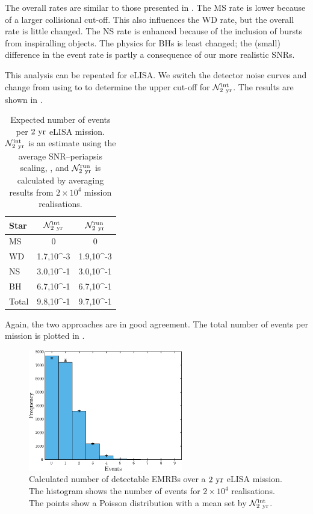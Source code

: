 The overall rates are similar to those presented in \citet{Hopman2007}. The MS rate is lower because of a larger collisional cut-off. This also influences the WD rate, but the overall rate is little changed. The NS rate is enhanced because of the inclusion of bursts from inspiralling objects. The physics for BHs is least changed; the (small) difference in the event rate is partly a consequence of our more realistic SNRs.

This analysis can be repeated for eLISA. We switch the detector noise curves and change from using  to  to determine the upper cut-off for $\mathcal{N}_{2~\mathrm{yr}}^\mathrm{int}$. The results are shown in .
\begin{table}\footnotesize
\centering
  \begin{tabular}{l D{,}{\,\times\,}{3.4} D{,}{\,\times\,}{3.4}}
  \toprule
  Star &  &  \\ \midrule
  MS &  &  \\
  WD & 1.7,10^{-3} & 1.9,10^{-3} \\
  NS & 3.0,10^{-1} & 3.0,10^{-1}  \\
  BH & 6.7,10^{-1} & 6.7,10^{-1} \\
  \midrule
  Total & 9.8,10^{-1} & 9.7,10^{-1} \\
  \bottomrule
\end{tabular}
  \caption{Expected number of events per $2~\mathrm{yr}$ eLISA mission. $\mathcal{N}_{2~\mathrm{yr}}^\mathrm{int}$ is an estimate using the average SNR--periapsis scaling, , and $\mathcal{N}_{2~\mathrm{yr}}^\mathrm{run}$ is calculated by averaging results from $2 \times 10^4$ mission realisations.}\label{tab:eLISA-Rates}
\end{table}
Again, the two approaches are in good agreement. The total number of events per mission is plotted in .
\begin{figure}%
\centering
   \includegraphics[width=0.6\textwidth]{./images/Fig_Total_event_hist_eLISA}
\caption{Calculated number of detectable EMRBs over a $2~\mathrm{yr}$ eLISA mission. The histogram shows the number of events for $2 \times 10^4$ realisations. The points show a Poisson distribution with a mean set by $\mathcal{N}_{2~\mathrm{yr}}^\mathrm{int}$.}
\label{fig:eLISA-Event-no}
\end{figure}
